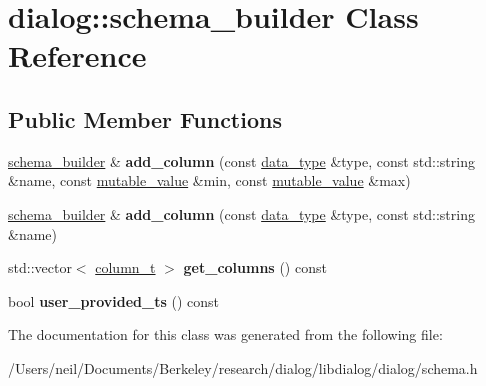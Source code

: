 \hypertarget{classdialog_1_1schema__builder}{}\section{dialog\+:\+:schema\+\_\+builder Class Reference}
\label{classdialog_1_1schema__builder}
\subsection*{Public Member Functions}
\begin{DoxyCompactItemize}
\item 
\mbox{\label{classdialog_1_1schema__builder_a0b5a658751816867502c52e61d74b0a4}} 
\hyperlink{classdialog_1_1schema__builder}{schema\+\_\+builder} \& {\bfseries add\+\_\+column} (const \hyperlink{structdialog_1_1data__type}{data\+\_\+type} \&type, const std\+::string \&name, const \hyperlink{classdialog_1_1mutable__value}{mutable\+\_\+value} \&min, const \hyperlink{classdialog_1_1mutable__value}{mutable\+\_\+value} \&max)
\item 
\mbox{\label{classdialog_1_1schema__builder_a86ea843765d10364b3cce07e590a94ac}} 
\hyperlink{classdialog_1_1schema__builder}{schema\+\_\+builder} \& {\bfseries add\+\_\+column} (const \hyperlink{structdialog_1_1data__type}{data\+\_\+type} \&type, const std\+::string \&name)
\item 
\mbox{\label{classdialog_1_1schema__builder_addb6fcdb1023a359e2ae43da8e360d02}} 
std\+::vector$<$ \hyperlink{classdialog_1_1column__t}{column\+\_\+t} $>$ {\bfseries get\+\_\+columns} () const
\item 
\mbox{\label{classdialog_1_1schema__builder_a61ff64bb16628608efb862477ce2f77c}} 
bool {\bfseries user\+\_\+provided\+\_\+ts} () const
\end{DoxyCompactItemize}


The documentation for this class was generated from the following file\+:\begin{DoxyCompactItemize}
\item 
/\+Users/neil/\+Documents/\+Berkeley/research/dialog/libdialog/dialog/schema.\+h\end{DoxyCompactItemize}
